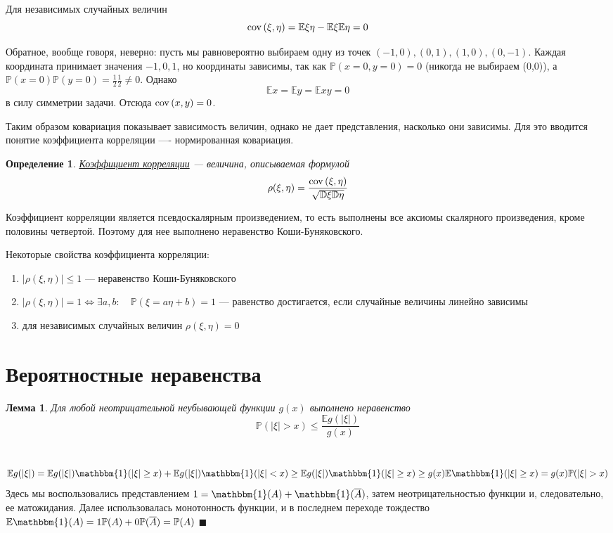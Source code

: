 \documentclass[12pt]{article}
\newtheorem{Def}{Определение}
\newtheorem{Lem}{Лемма}
\newenvironment{Proof}{\par\noindent{\bf Доказательство}}{$\blacksquare$}
\numberwithin{Th}{section}
\numberwithin{Def}{section}
\numberwithin{Lem}{section}
\numberwithin{St}{section}
\numberwithin{equation}{section}
\newcommand\Pro{\mathbb{P}} %
\newcommand\Expec{\mathbb{E}} %
\newcommand\Disp{\mathbb{D}}  %
\newcommand\Ind{\mathbbm{1}} %
\newcommand\Cov{{\rm cov \,}} %
\begin{document}
Для независимых случайных величин
$$\Cov(\xi,\eta) = \Expec\xi\eta - \Expec\xi\Expec\eta = 0$$

Обратное, вообще говоря, неверно: пусть мы равновероятно выбираем одну из точек $(-1, 0), (0, 1), (1, 0), (0, -1)$. Каждая координата принимает значения $-1, 0, 1$, но координаты зависимы, так как $\Pro(x=0,  y=0) = 0$ (никогда не выбираем (0,0)), а $\Pro(x=0)\Pro(y=0) = \frac12\frac12 \not=0$. Однако
$$\Expec x = \Expec y = \Expec xy = 0$$ в силу симметрии задачи. Отсюда $\Cov(x,y) = 0$.

Таким образом ковариация показывает зависимость величин, однако не дает представления, насколько они зависимы. Для это вводится понятие коэффициента корреляции ---- нормированная ковариация.

\begin{Def}
\underline{Коэффициент корреляции} --- величина, описываемая формулой
$$\rho(\xi, \eta) = \frac{\Cov(\xi, \eta)}{\sqrt{\Disp\xi\Disp\eta}}$$
\end{Def}

Коэффициент корреляции является псевдоскалярным произведением, то есть выполнены все аксиомы скалярного произведения, кроме половины четвертой. Поэтому для нее выполнено неравенство Коши-Буняковского.

Некоторые свойства коэффициента корреляции:
\begin{enumerate}
	\item $|\rho(\xi, \eta)| \le 1$ --- неравенство Коши-Буняковского
	\item $|\rho(\xi, \eta)| = 1 \Leftrightarrow \exists a, b \colon \quad \Pro(\xi = a\eta + b) = 1$ --- равенство достигается, если случайные величины линейно зависимы
	\item для независимых случайных величин $\rho(\xi, \eta) = 0$
\end{enumerate} 



\newpage
\section{Вероятностные неравенства}
\begin{Lem}
Для любой неотрицательной неубывающей функции $g(x)$ выполнено неравенство 
$$\Pro(|\xi| > x) \le \frac{\Expec g(|\xi|)}{g(x)}$$
\end{Lem}
\begin{Proof} \\
$$\Expec g(|\xi|) = \Expec g(|\xi|) \Ind(|\xi| \ge x) + \Expec g(|\xi|) \Ind(|\xi| < x) \ge \Expec g(|\xi|) \Ind(|\xi| \ge x) \ge g(x)\Expec\Ind(|\xi| \ge x) = g(x)\Pro(|\xi| > x)$$
Здесь мы воспользовались представлением $1 = \Ind(A) + \Ind(\overline{A})$, затем неотрицательностью функции и, следовательно, ее матожидания. Далее использовалась монотонность функции, и в последнем переходе тождество $\Expec \Ind(A) = 1 \Pro(A) + 0 \Pro(\overline{A}) = \Pro(A)$
\end{Proof}
\end{document}
